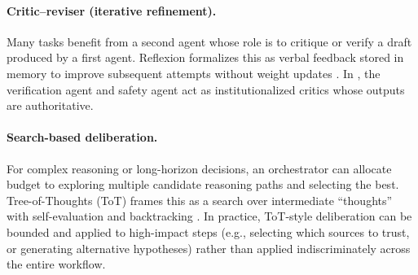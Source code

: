 \paragraph{Critic--reviser (iterative refinement).}
Many tasks benefit from a second agent whose role is to critique or verify a draft produced by a first agent.
Reflexion formalizes this as verbal feedback stored in memory to improve subsequent attempts without weight updates \cite{Shinn2023Reflexion}.
In \ishtar{}, the verification agent and safety agent act as institutionalized critics whose outputs are authoritative.

\paragraph{Search-based deliberation.}
For complex reasoning or long-horizon decisions, an orchestrator can allocate budget to exploring multiple candidate reasoning paths and selecting the best.
Tree-of-Thoughts (ToT) frames this as a search over intermediate ``thoughts'' with self-evaluation and backtracking \cite{Yao2023TreeOfThoughts}.
In practice, ToT-style deliberation can be bounded and applied to high-impact steps (e.g., selecting which sources to trust, or generating alternative hypotheses) rather than applied indiscriminately across the entire workflow.


